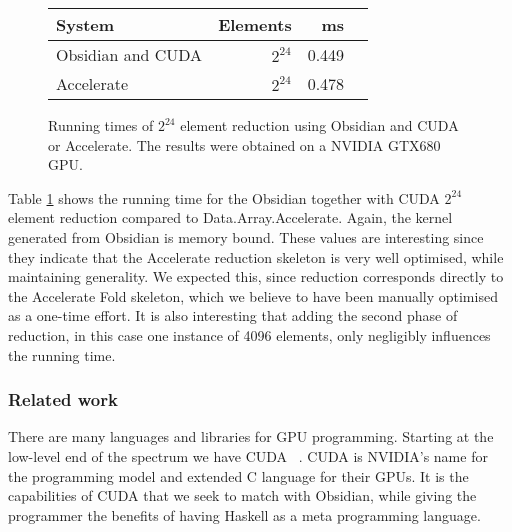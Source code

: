 \begin{figure}
\centering 
\begin{small}
\begin{tabular}{| l | r | r | r | }
\hline 
  System            & Elements & ms    \\ \hline 
  Obsidian and CUDA & $2^{24}$  & 0.449 \\ \hline
  Accelerate        & $2^{24}$  & 0.478 \\ \hline
\end{tabular}
\caption{Running times of $2^{24}$ element reduction using Obsidian and CUDA 
or Accelerate. The results were obtained on a NVIDIA GTX680 GPU.}

\label{fig:CUDATABLE} 
\end{small}
\end{figure}

Table \ref{fig:CUDATABLE} shows the running time for the Obsidian together with 
CUDA $2^{24}$ element reduction compared to Data.Array.Accelerate. 
Again, the kernel generated from Obsidian is memory bound.
These values are 
interesting since they indicate that the Accelerate reduction skeleton is 
very well optimised, while maintaining generality. We expected this, since 
reduction corresponds directly to the Accelerate Fold skeleton, which
we believe to have been manually optimised as a one-time effort. It is also 
interesting that adding the second phase of reduction, in this case 
one instance of 4096 elements, only negligibly influences the running time.




\subsubsection{Related work}

There are many languages and libraries for GPU programming. Starting at the 
low-level end of the spectrum we have CUDA ~. CUDA is NVIDIA's 
name for the programming model and extended C language for their GPUs. 
It is 
the capabilities of CUDA that we seek to match with Obsidian,
while giving the programmer the benefits of having Haskell as a meta programming 
language. 

